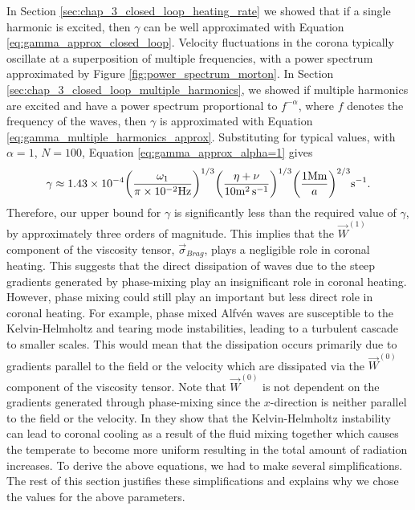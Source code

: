 In Section \ref{sec:chap_3_closed_loop_heating_rate} we showed that if a single harmonic is excited, then $\gamma$ can be well approximated with Equation \eqref{eq:gamma_approx_closed_loop}. Velocity fluctuations in the corona typically oscillate at a superposition of multiple frequencies, with a power spectrum approximated by Figure \ref{fig:power_spectrum_morton}. In Section \ref{sec:chap_3_closed_loop_multiple_harmonics}, we showed if multiple harmonics are excited and have a power spectrum proportional to $f^{-\alpha}$, where $f$ denotes the frequency of the waves, then $\gamma$ is approximated with Equation \eqref{eq:gamma_multiple_harmonics_approx}. Substituting for typical values, with $\alpha=1$, $N=100$, Equation \eqref{eq:gamma_approx_alpha=1} gives
\begin{equation}
    \label{eq:upper_bound_for_gammma}
    \gamma \approx 1.43\times10^{-4} \qty(\frac{\omega_1}{\pi\times10^{-2}\si{.Hz}})^{1/3}\qty(\frac{\eta+\nu}{10\si{.m^2.s^{-1}}})^{1/3}\qty(\frac{1\si{.Mm}}{a})^{2/3}\si{.s^{-1}}.
\end{equation}
Therefore, our upper bound for $\gamma$ is significantly less than the required value of $\gamma$, by approximately three orders of magnitude. This implies that the $\vec{W}^{(1)}$ component of the viscosity tensor, $\vec{\sigma}_{Brag}$, plays a negligible role in coronal heating. This suggests that the direct dissipation of waves due to the steep gradients generated by phase-mixing play an insignificant role in coronal heating. However, phase mixing could still play an important but less direct role in coronal heating. For example, phase mixed Alfv\'en waves are susceptible to the Kelvin-Helmholtz and tearing mode instabilities, leading to a turbulent cascade to smaller scales. This would mean that the dissipation occurs primarily due to gradients parallel to the field or the velocity which are dissipated via the $\vec{W}^{(0)}$ component of the viscosity tensor. Note that $\vec{W}^{(0)}$ is not dependent on the gradients generated through phase-mixing since the $x$-direction is neither parallel to the field or the velocity. In \citet{Hillier2019} they show that the Kelvin-Helmholtz instability can lead to coronal cooling as a result of the fluid mixing together which causes the temperate to become more uniform resulting in the total amount of radiation increases. To derive the above equations, we had to make several simplifications. The rest of this section justifies these simplifications and explains why we chose the values for the above parameters.

